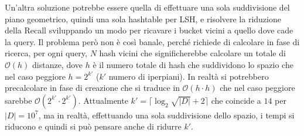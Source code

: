 Un'altra soluzione potrebbe essere quella di effettuare una sola suddivisione del
piano geometrico, quindi una sola hashtable per LSH, e risolvere la riduzione della 
Recall sviluppando un modo per ricavare i bucket vicini a quello dove cade la query.
Il problema però non è così banale, perché richiede di calcolare in fase di ricerca, per ogni query,
$N$ hash vicini che significherebbe calcolare un totale di $\mathcal{O}(h)$ 
distanze, dove $h$ è il numero totale di hash che suddividono lo spazio che nel 
caso peggiore $h= 2^{k'}$ ($k'$ numero di iperpiani). In realtà 
si potrebbero precalcolare in fase di creazione che si traduce in $\mathcal{O}(h\cdot h)$
che nel caso peggiore sarebbe $ \mathcal{O}(2^{k'}\cdot 2^{k'})$. Attualmente 
$k'=\lceil \log_2\sqrt{|D|}+2\rceil$ che coincide a $14$ per $|D|= 10^7$, ma in realtà,
effettuando una sola suddivisione dello spazio, i tempi si riducono e quindi 
si può pensare anche di ridurre $k'$.